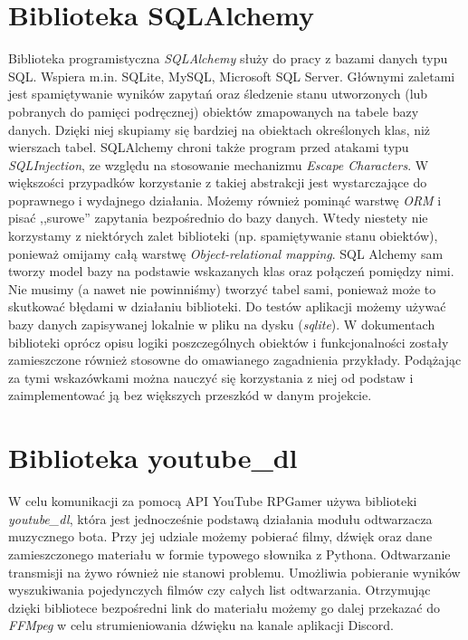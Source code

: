 \documentclass[shortabstract,inz]{iithesis}
\begin{document}
		\section{Biblioteka SQLAlchemy}
			Biblioteka programistyczna \textit{SQLAlchemy}\cite{sqlalchemydocs} służy do pracy z bazami danych typu SQL. Wspiera m.in. SQLite, MySQL, Microsoft SQL Server. Głównymi zaletami jest spamiętywanie wyników zapytań oraz śledzenie stanu utworzonych (lub pobranych do pamięci podręcznej) obiektów zmapowanych na tabele bazy danych. Dzięki niej skupiamy się bardziej na obiektach określonych klas, niż wierszach tabel. SQLAlchemy chroni także program przed atakami typu \textit{SQLInjection}\cite{sqlinjection}, ze względu na stosowanie mechanizmu \textit{Escape Characters}\cite{escchars}. W większości przypadków korzystanie z takiej abstrakcji jest wystarczające do poprawnego i wydajnego działania. Możemy również pominąć warstwę \textit{ORM}\cite{wikiorm} i pisać ,,surowe'' zapytania bezpośrednio do bazy danych. Wtedy niestety nie korzystamy z niektórych zalet biblioteki (np. spamiętywanie stanu obiektów), ponieważ omijamy całą warstwę \textit{Object-relational mapping}. SQL Alchemy sam tworzy model bazy na podstawie wskazanych klas oraz połączeń pomiędzy nimi. Nie musimy (a nawet nie powinniśmy) tworzyć tabel sami, ponieważ może to skutkować błędami w działaniu biblioteki. Do testów aplikacji możemy używać bazy danych zapisywanej lokalnie w pliku na dysku (\textit{sqlite}\cite{sqlite}). W dokumentach biblioteki oprócz opisu logiki poszczególnych obiektów i funkcjonalności zostały zamieszczone również stosowne do omawianego zagadnienia przykłady. Podążając za tymi wskazówkami można nauczyć się korzystania z niej od podstaw i zaimplementować ją bez większych przeszkód w danym projekcie.
		\section{Biblioteka youtube\_dl}
			W celu komunikacji za pomocą API YouTube RPGamer używa biblioteki \textit{youtube\_dl}\cite{youtubedl}, która  jest jednocześnie podstawą działania modułu odtwarzacza muzycznego bota. Przy jej udziale możemy pobierać filmy, dźwięk oraz dane zamieszczonego materiału w formie typowego słownika z Pythona. Odtwarzanie transmisji na żywo również nie stanowi problemu. Umożliwia pobieranie wyników wyszukiwania pojedynczych filmów czy całych list odtwarzania. Otrzymując dzięki bibliotece bezpośredni link do materiału możemy go dalej przekazać do \textit{FFMpeg}\cite{ffmpeg} w celu strumieniowania dźwięku na kanale aplikacji Discord. 
	
\end{document}
